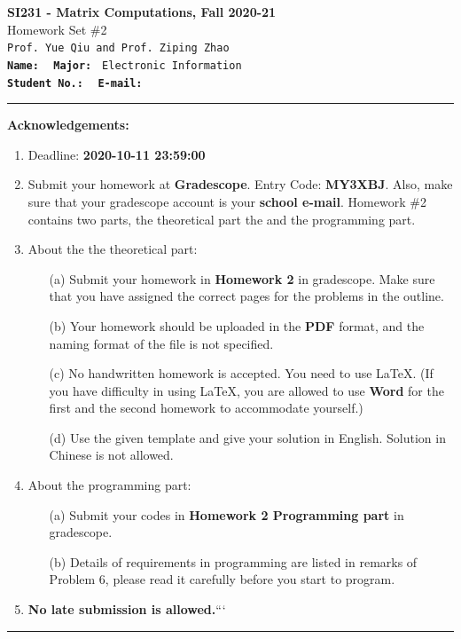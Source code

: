 \documentclass[english,onecolumn]{IEEEtran}
\begin{document}
\begin{center}
	\textbf{{\Large SI231 - Matrix Computations, Fall 2020-21}}\\
	Homework Set \#2\\
   \texttt{Prof. Yue Qiu and Prof. Ziping Zhao} \\
	\texttt{\textbf{Name:}}   	\texttt{  }  		\hspace{1bp}
	\texttt{\textbf{Major:}}  	\texttt{ Electronic Information } 	\\
	\texttt{\textbf{Student No.:}} 	\texttt{  }     \hspace{1bp}
	\texttt{\textbf{E-mail:}} 	\texttt{ }
\par\end{center}


\noindent
\rule{\linewidth}{0.4pt}
{\bf {\large Acknowledgements:}}
\begin{enumerate}
    \item Deadline: \textbf{2020-10-11 23:59:00}
    \item Submit your homework at \textbf{Gradescope}. Entry Code: \textbf{MY3XBJ}. Also, make sure that your gradescope account is your \textbf{school e-mail}.
    Homework \#2 contains two parts, the theoretical part the and the programming part.
    \item About the the theoretical part:
    \begin{enumerate}
            \item[(a)] Submit your homework in \textbf{Homework 2} in gradescope. Make sure that you have assigned the correct pages for the problems in the outline.
            \item[(b)] Your homework should be uploaded in the \textbf{PDF} format, and the naming format of the file is not specified.
            \item[(c)] No handwritten homework is accepted. You need to use \LaTeX. (If you have difficulty in using \LaTeX, you are allowed to use \textbf{Word} for the first and the second homework to accommodate yourself.)
            \item[(d)] Use the given template and give your solution in English. Solution in Chinese is not allowed. 
        \end{enumerate}
  \item About the programming part:
  \begin{enumerate}
      \item[(a)] Submit your codes in \textbf{Homework 2 Programming part} in gradescope.
      \item[(b)] Details of requirements in programming are listed in remarks of Problem 6, please read it carefully before you start to program.
  \end{enumerate}
  \item \textbf{No late submission is allowed.}```
\end{enumerate}
\rule{\linewidth}{0.4pt}
\newpage 
\end{document}
